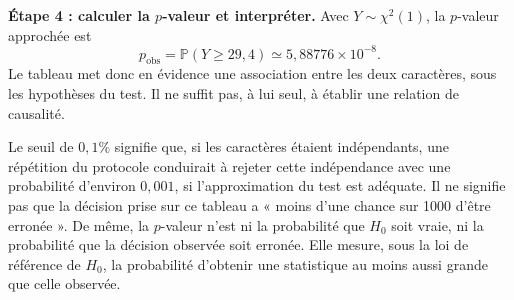 {\begin{enumerate}
{\textbf{Étape 4 : calculer la $p$-valeur et interpréter.} Avec $Y\sim\chi^2(1)$, la $p$-valeur approchée est
\[
p_{\mathrm{obs}}=\mathbb P(Y\geq29{,}4)\simeq5{,}88776\times10^{-8}.
\]
Le tableau met donc en évidence une association entre les deux caractères, sous les hypothèses du test. Il ne suffit pas, à lui seul, à établir une relation de causalité.

Le seuil de $0{,}1\%$ signifie que, si les caractères étaient indépendants, une répétition du protocole conduirait à rejeter cette indépendance avec une probabilité d'environ $0{,}001$, si l'approximation du test est adéquate. Il ne signifie pas que la décision prise sur ce tableau a « moins d'une chance sur 1000 d'être erronée ».
De même, la $p$-valeur n'est ni la probabilité que $H_0$ soit vraie, ni la probabilité que la décision observée soit erronée. Elle mesure, sous la loi de référence de $H_0$, la probabilité d'obtenir une statistique au moins aussi grande que celle observée.
}
\end{enumerate}
}
